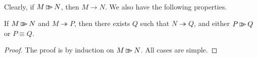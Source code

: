 \begin{code}
\\
\>[0]\<[2]%
\>[2] \AgdaSymbol{:}  \AgdaSymbol{\{}   \AgdaSymbol{:}  \AgdaSymbol{\}}       \AgdaSymbol{(}  \AgdaSymbol{)} \AgdaSymbol{(}  \AgdaSymbol{)}\<%
\end{code}

Clearly, if $M \mathop{\rhd \!\!\! \rhd} N$, then $M \rightarrow N$.  We also have the following properties.

\begin{lm}
\label{lm:krsn}
If $M \mathop{\rhd \!\!\! \rhd} N$ and $M \twoheadrightarrow P$, then there exists $Q$ such that $N \twoheadrightarrow Q$, and either $P \mathop{\rhd \!\!\! \rhd} Q$ or $P \equiv Q$.
\end{lm}

\begin{proof}
The proof is by induction on $M \mathop{\rhd \!\!\! \rhd} N$.  All cases are simple.
\end{proof}

\begin{code}%
\>  \AgdaSymbol{:}  \AgdaSymbol{\{}\AgdaSymbol{\}} \AgdaSymbol{\{}\AgdaSymbol{\}} \AgdaSymbol{\{}   \AgdaSymbol{:}   \AgdaSymbol{\}} \<%
\\
\>[2]\<[30]%
\>[30]        \AgdaFunction{Σ[}      \AgdaFunction{]} \AgdaSymbol{(}      \AgdaSymbol{)}  \AgdaSymbol{(}      \AgdaSymbol{)}\<%
\\
%
\\
\>  \AgdaSymbol{:}  \AgdaSymbol{\{}\AgdaSymbol{\}} \AgdaSymbol{\{}   \AgdaSymbol{:}  \AgdaSymbol{\}} \<%
\\
\>[0]\<[23]%
\>[23]        \AgdaSymbol{(}  \AgdaSymbol{)}   \AgdaSymbol{(}  \AgdaSymbol{)}\<%
\end{code}

